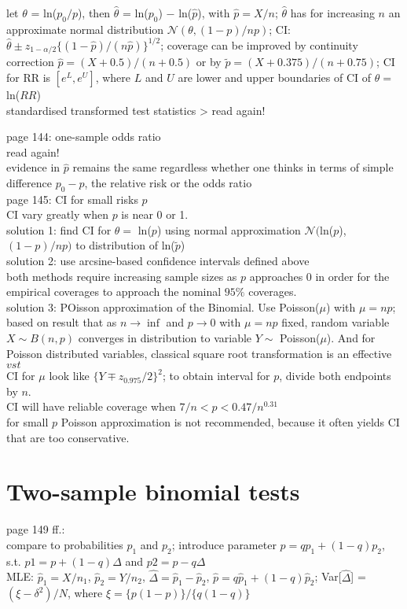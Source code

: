 let $\theta$ = ln($p_0/p$), then $\hat{\theta}$ = ln($p_0$) $-$ ln($\hat{p}$), with $\hat{p}=X/n$; $\hat{\theta}$ has for increasing $n$ an approximate normal distribution $\mathcal{N}(\theta, (1-p)/np)$; CI: $\hat{\theta}\pm z_{1-\alpha/2}\{(1-\hat{p})/(n\hat{p})\}^{1/2}$; coverage can be improved by continuity correction $\hat{p}=(X+0.5)/(n+0.5)$ or by $\tilde{p} = (X+0.375)/(n+0.75)$; CI for RR is $[e^L,e^U]$, where $L$ and $U$ are lower and upper boundaries of CI of $\theta =$ ln($RR$)\\

standardised transformed test statistics > read again!

page 144: one-sample odds ratio\\
read again!\\
evidence in $\hat{p}$ remains the same regardless whether one thinks in terms of simple difference $p_0-p$, the relative risk or the odds ratio\\

page 145: CI for small risks $p$\\
CI vary greatly when $p$ is near 0 or 1.\\
solution 1: find CI for $\theta =$ ln($p$) using normal approximation $\mathcal{N}($ln($p$), $(1-p)/np)$ to distribution of ln($\tilde{p}$)\\
solution 2: use arcsine-based confidence intervals defined above\\
both methods require increasing sample sizes as $p$ approaches 0 in order for the empirical coverages to approach the nominal $95 \%$ coverages.\\
solution 3: POisson approximation of the Binomial. Use Poisson($\mu$) with $\mu = np$; based on result that as $n \rightarrow \inf$ and $p \rightarrow 0$ with $\mu=np$ fixed, random variable $X \sim B(n,p)$ converges in distribution to variable $Y\sim$ Poisson($\mu$). And for Poisson distributed variables, classical square root transformation is an effective $vst$\\
CI for $\mu$ look like $\{Y \mp z_{0.975}/2\}^2$; to obtain interval for $p$, divide both endpoints by $n$.\\
CI will have reliable coverage when $7/n < p < 0.47/n^{0.31}$\\
for small $p$ Poisson approximation is not recommended, because it often yields CI that are too conservative.

\section{Two-sample binomial tests}
page 149 ff.:\\
compare to probabilities $p_1$ and $p_2$; introduce parameter $p=qp_1 + (1-q)p_2$, s.t. $p1 = p+(1-q)\Delta$ and $p2 = p-q\Delta$\\
MLE: $\hat{p}_1=X/n_1$, $\hat{p}_2=Y/n_2$, $\hat{\Delta}=\hat{p}_1-\hat{p}_2$, $\hat{p}=q\hat{p}_1+(1-q)\hat{p}_2$; Var[$\hat{\Delta}$] = $(\xi - \delta^2)/N$, where $\xi = \{p(1-p)\}/\{q(1-q)\}$\\


